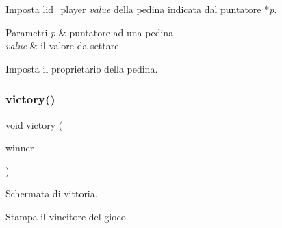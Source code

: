Imposta l\textquotesingle{}id\+\_\+player {\itshape value} della pedina indicata dal puntatore {\itshape $\ast$p}. 


\begin{DoxyParams}{Parametri}
{\em p} & puntatore ad una pedina \\
\hline
{\em value} & il valore da settare\\
\hline
\end{DoxyParams}
Imposta il proprietario della pedina. \mbox{\label{group__Funzioni_ga126ef35a3cacdc550c03a737bf1311bf}} 
\subsubsection{\texorpdfstring{victory()}{victory()}}
{\footnotesize\ttfamily void victory (\begin{DoxyParamCaption}\item[{\hyperlink{ml__lib_8h_a0330ff92cbc796e96c3ce3e4401bf1e1}{id\+\_\+p}}]{winner }\end{DoxyParamCaption})}



Schermata di vittoria. 

Stampa il vincitore del gioco. 